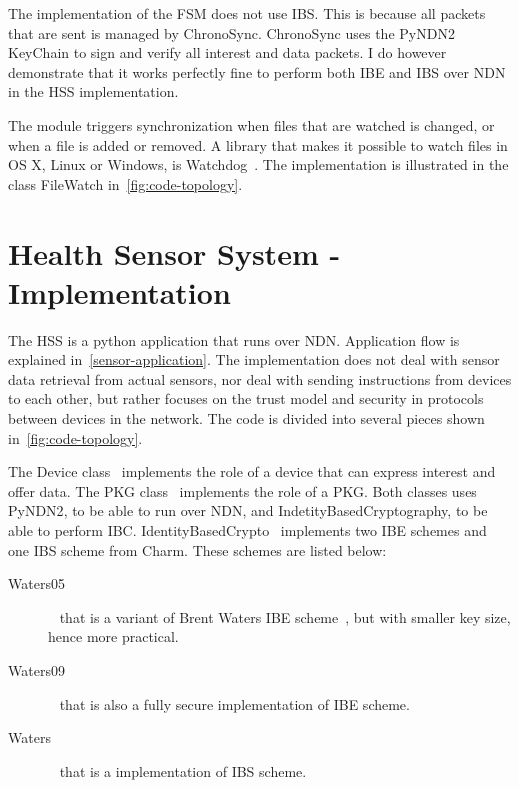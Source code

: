 The implementation of the \gls{FSM} does not use \gls{IBS}. 
This is because all packets that are sent is managed by ChronoSync. 
ChronoSync uses the PyNDN2 KeyChain to sign and verify all \gls{interest} and \gls{data} packets.
I do however demonstrate that it works perfectly fine to perform both \gls{IBE} and \gls{IBS} over \gls{NDN} in the \gls{HSS} implementation.

The module triggers synchronization when files that are watched is changed, or when a file is added or removed.
A library that makes it possible to watch files in OS X, Linux or Windows, is Watchdog~\cite{watchdog}. 
The implementation is illustrated in the class FileWatch in~\autoref{fig:code-topology}.

\section{Health Sensor System - Implementation}
The \gls{HSS} is a python application that runs over \gls{NDN}.
Application flow is explained in~\autoref{sensor-application}.
The implementation does not deal with sensor data retrieval from actual sensors, nor deal with sending instructions from devices to each other, but rather focuses on the trust model and security in protocols between devices in the network.
The code is divided into several pieces shown in~\autoref{fig:code-topology}.

The Device class~\cite[device.py]{garseg15} implements the role of a device that can express \gls{interest} and offer \gls{data}.
The PKG class~\cite[publicKeyGenerator.py]{garseg15} implements the role of a \gls{PKG}.
Both classes uses \gls{PyNDN2}, to be able to run over \gls{NDN}, and IndetityBasedCryptography, to be able to perform \gls{IBC}. 
IdentityBasedCrypto~\cite[identityBasedCrypto.py]{garseg15} implements two \gls{IBE} schemes and one \gls{IBS} scheme from Charm. 
These schemes are listed below:
\begin{description}
  \item[Waters05]~\cite{DBLP:journals/iacr/Naccache05} that is a variant of Brent Waters \gls{IBE} scheme~\cite{DBLP:journals/iacr/Waters04}, but with smaller key size, hence more practical.
  \item[Waters09]~\cite{DBLP:conf/crypto/Waters09} that is also a fully secure implementation of \gls{IBE} scheme.
  \item[Waters]~\cite{DBLP:journals/iacr/Waters04} that is a implementation of \gls{IBS} scheme.
\end{description}


